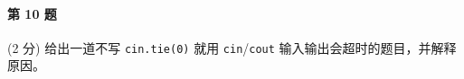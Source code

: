 \paragraph{第 10 题} (2 分) 给出一道不写 \lstinline{cin.tie(0)}
就用 \lstinline{cin}/\lstinline{cout} 输入输出会超时的题目，并解释原因。
